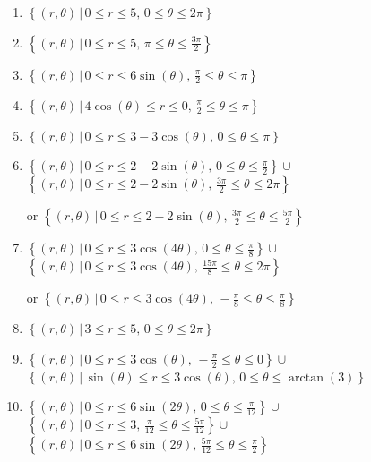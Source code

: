 \documentclass{ximera}
\begin{document}
\begin{enumerate}

\setcounter{enumi}{\value{HW}}

\item $\left\{ (r,\theta) \, | \, 0 \leq r \leq 5, \, 0\leq \theta \leq 2\pi \right\}$
\item $\left\{ (r,\theta) \, | \, 0 \leq r \leq 5, \, \pi \leq \theta \leq \frac{3\pi}{2} \right\}$
\item $\left\{ (r,\theta) \, | \, 0 \leq r \leq 6\sin(\theta), \, \frac{\pi}{2} \leq \theta \leq \pi \right\}$
\item $\left\{ (r,\theta) \, | \, 4\cos(\theta) \leq r \leq 0, \, \frac{\pi}{2} \leq \theta \leq \pi \right\}$
\item $\left\{ (r,\theta) \, | \, 0 \leq r \leq 3 - 3\cos(\theta), \, 0 \leq \theta \leq \pi \right\}$
\item $\left\{ (r,\theta) \, | \, 0 \leq r \leq 2-2\sin(\theta), \, 0 \leq \theta \leq \frac{\pi}{2}  \right\} \cup$ 
$\left\{ (r,\theta) \, | \, 0 \leq r \leq  2-2\sin(\theta), \, \frac{3\pi}{2} \leq \theta \leq 2\pi  \right\}$

or  $\left\{ (r,\theta) \, | \, 0 \leq r \leq 2-2\sin(\theta), \, \frac{3\pi}{2} \leq \theta \leq \frac{5\pi}{2}  \right\}$
 
\item $\left\{ (r,\theta) \, | \, 0 \leq r \leq 3\cos(4\theta), \,0 \leq \theta \leq \frac{\pi}{8} \right\} \cup$ $\left\{ (r,\theta) \, | \, 0 \leq r \leq 3\cos(4\theta), \,\frac{15\pi}{8} \leq \theta \leq 2\pi \right\}$  

or $\left\{ (r,\theta) \, | \, 0 \leq r \leq 3\cos(4\theta), \, -\frac{\pi}{8} \leq \theta \leq \frac{\pi}{8} \right\}$

\item   $\left\{ (r,\theta) \, | \, 3 \leq r \leq 5, \, 0 \leq \theta \leq 2\pi \right\}$

\item $\left\{ (r,\theta) \, | \, 0 \leq r \leq 3\cos(\theta), \, -\frac{\pi}{2} \leq \theta \leq 0 \right\} \cup$ 
$\left\{ (r,\theta) \, | \, \sin(\theta) \leq r \leq 3\cos(\theta), \, 0 \leq \theta \leq \arctan(3) \right\}$

\item  $\left\{ (r,\theta) \, | \, 0 \leq r \leq 6\sin(2\theta), \,0 \leq \theta \leq \frac{\pi}{12} \right\} \cup$ $\left\{ (r,\theta) \, | \, 0 \leq r \leq 3, \,\frac{\pi}{12} \leq \theta \leq \frac{5\pi}{12} \right\} \cup$ \\ $\left\{ (r,\theta) \, | \, 0 \leq r \leq 6\sin(2\theta), \, \frac{5\pi}{12} \leq \theta \leq \frac{\pi}{2} \right\}$

\end{enumerate}
\end{document}
